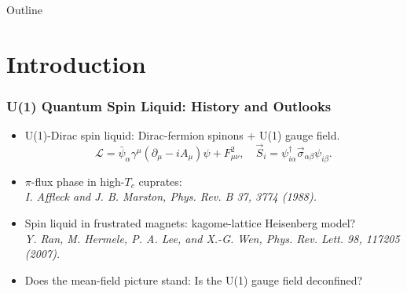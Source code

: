 \documentclass[xcolor=table, 10pt, aspectratio=169]{beamer}
\begin{document}
\begin{frame}{Outline}
		\tableofcontents
\end{frame}

\section{Introduction}

\begin{frame}
  \frametitle{U(1) Quantum Spin Liquid: History and Outlooks}
\begin{itemize}
	\item U(1)-Dirac spin liquid: Dirac-fermion spinons + U(1) gauge field.
	\[\mathcal L = \bar\psi_\alpha \gamma^\mu(\partial_\mu-iA_\mu)\psi +  F_{\mu\nu}^2,\quad
	\vec S_i = \psi^\dagger_{i\alpha}\vec\sigma_{\alpha\beta}\psi_{i\beta}.\]
	\item $\pi$-flux phase in high-$T_c$ cuprates:\\
	\emph{\small I. Affleck and J. B. Marston, Phys. Rev. B 37, 3774 (1988).}
	\item Spin liquid in frustrated magnets: kagome-lattice Heisenberg model?\\
	\emph{\small Y. Ran, M. Hermele, P. A. Lee, and X.-G. Wen, Phys. Rev. Lett. 98, 117205 (2007).}

  \item Does the mean-field picture stand: Is the U(1) gauge field deconfined?
\end{itemize}
\end{frame}
\end{document}
